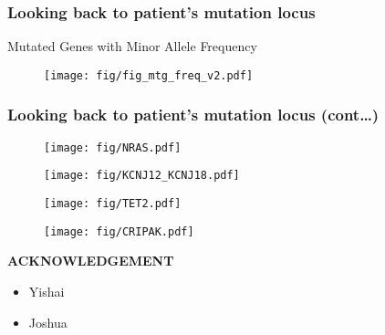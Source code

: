 \documentclass{beamer}
\begin{document}
\begin{frame}[fragile] %
\frametitle{Looking back to patient's mutation locus}
\centering Mutated Genes with Minor Allele Frequency  
\begin{figure}
   \texttt{[image: fig/fig\_mtg\_freq\_v2.pdf]}
\end{figure}
\end{frame}

\begin{frame}[fragile] 
\frametitle{Looking back to patient's mutation locus (cont\dots) }
\begin{figure}[ht]
\centering
\begin{minipage}[b]{0.45\linewidth}
   \texttt{[image: fig/NRAS.pdf]}
\end{minipage}
\centering
\begin{minipage}[b]{0.45\linewidth}
   \texttt{[image: fig/KCNJ12\_KCNJ18.pdf]}
\end{minipage}
\begin{minipage}[b]{0.45\linewidth}
   \texttt{[image: fig/TET2.pdf]}  
\end{minipage}
\begin{minipage}[b]{0.45\linewidth}
   \texttt{[image: fig/CRIPAK.pdf]} 
\end{minipage}
\end{figure}
\end{frame}
\begin{frame}
\centering \textbf{ACKNOWLEDGEMENT}
\begin{itemize}
	\item \centering Yishai 
	\item \centering Joshua 

\end{itemize}
\end{frame}

\end{document}
